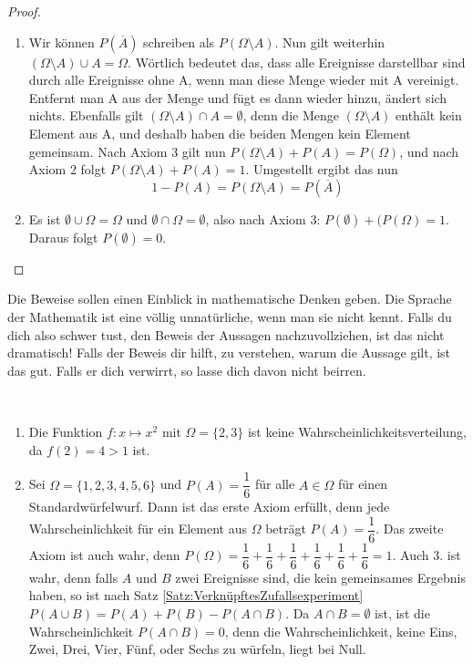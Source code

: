 \documentclass[ngerman, 12pt]{nssheetxea}
\begin{document}
\begin{proof} \
\begin{enumerate}
\item Wir können $P(\overline{A})$ schreiben als $P(\Omega\setminus A)$. Nun gilt weiterhin $(\Omega \setminus A)\cup A=\Omega$. Wörtlich bedeutet das, dass alle Ereignisse darstellbar sind durch alle Ereignisse ohne A, wenn man diese Menge wieder mit A vereinigt. Entfernt man A aus der Menge und fügt es dann wieder hinzu, ändert sich nichts. Ebenfalls gilt $(\Omega \setminus A)\cap A=\emptyset$, denn die Menge $(\Omega \setminus A)$ enthält kein Element aus A, und deshalb haben die beiden Mengen kein Element gemeinsam. Nach Axiom 3 gilt nun $P(\Omega \setminus A) + P(A) = P(\Omega)$, und nach Axiom 2 folgt $P(\Omega \setminus A) + P(A) = 1$. Umgestellt ergibt das nun
\[ 1- P(A) = P(\Omega \setminus A) = P(\overline{A}) \]
\item Es ist $\emptyset \cup \Omega = \Omega$ und $\emptyset \cap \Omega = \emptyset$, also nach Axiom 3: $P(\emptyset)+(P(\Omega) = 1$. Daraus folgt $P(\emptyset)=0$.
\end{enumerate}
\end{proof}

Die Beweise sollen einen Einblick in mathematische Denken geben. Die Sprache der Mathematik ist eine völlig unnatürliche, wenn man sie nicht kennt. Falls du dich also schwer tust, den Beweis der Aussagen nachzuvollziehen, ist das nicht dramatisch! Falls der Beweis dir hilft, zu verstehen, warum die Aussage gilt, ist das gut. Falls er dich verwirrt, so lasse dich davon nicht beirren. 

\begin{example} \ 
\begin{enumerate}
\item Die Funktion $f: x \mapsto x^2$ mit $\Omega=\{2,3\}$ ist keine Wahrscheinlichkeitsverteilung, da $f(2)=4>1$ ist. 
\item Sei $\Omega =\{1,2,3,4,5,6  \}$ und $P(A)=\dfrac{1}{6}$ für alle $A\in \Omega$ für einen Standardwürfelwurf. Dann ist das erste Axiom erfüllt, denn jede Wahrscheinlichkeit für ein Element aus $\Omega$ beträgt $P(A)=\dfrac{1}{6}$. Das zweite Axiom ist auch wahr, denn $P(\Omega) = \dfrac{1}{6}+\dfrac{1}{6}+\dfrac{1}{6}+\dfrac{1}{6}+\dfrac{1}{6}+\dfrac{1}{6}=1$. Auch 3. ist wahr, denn falls $A$ und $B$ zwei Ereignisse sind, die kein gemeinsames Ergebnis haben, so ist nach Satz \ref{Satz:VerknüpftesZufallsexperiment} $P(A\cup B)=P(A)+P(B)-P(A\cap B)$. Da $A\cap B = \emptyset$ ist, ist die Wahrscheinlichkeit $P(A\cap B) = 0$, denn die Wahrscheinlichkeit, keine Eins, Zwei, Drei, Vier, Fünf, oder Sechs zu würfeln, liegt bei Null.
\end{enumerate}
\end{example}
\end{document}
